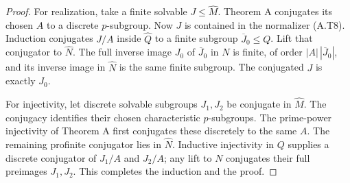 \begin{proof}
For realization, take a finite solvable $J\leq\widehat M$.
Theorem A conjugates its chosen $A$ to a discrete $p$-subgroup.
Now $J$ is contained in the normalizer (A.T8).  Induction
conjugates $J/A$ inside $\widehat Q$ to a finite subgroup
$\overline J_0\leq Q$.  Lift that conjugator to $\widehat N$.
The full inverse image $J_0$ of $\overline J_0$ in $N$ is
finite, of order $|A|\,|\overline J_0|$, and its inverse image
in $\widehat N$ is the same finite subgroup.  The conjugated
$J$ is exactly $J_0$.

For injectivity, let discrete solvable subgroups $J_1,J_2$ be
conjugate in $\widehat M$.  The conjugacy identifies their
chosen characteristic $p$-subgroups.  The prime-power injectivity
of Theorem A first conjugates these discretely to the same $A$.
The remaining profinite conjugator lies in $\widehat N$.
Inductive injectivity in $Q$ supplies a discrete conjugator of
$J_1/A$ and $J_2/A$; any lift to $N$ conjugates their full
preimages $J_1,J_2$.  This completes the induction and the proof.
\end{proof}

